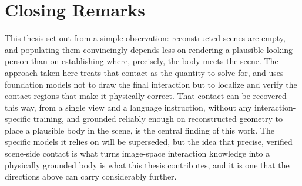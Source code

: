 \section*{Closing Remarks}
 
This thesis set out from a simple observation: reconstructed scenes are empty, and populating them convincingly depends less on rendering a plausible-looking person than on establishing where, precisely, the body meets the scene. The approach taken here treats that contact as the quantity to solve for, and uses foundation models not to draw the final interaction but to localize and verify the contact regions that make it physically correct. That contact can be recovered this way, from a single view and a language instruction, without any interaction-specific training, and grounded reliably enough on reconstructed geometry to place a plausible body in the scene, is the central finding of this work. The specific models it relies on will be superseded, but the idea that precise, verified scene-side contact is what turns image-space interaction knowledge into a physically grounded body is what this thesis contributes, and it is one that the directions above can carry considerably further.
 
